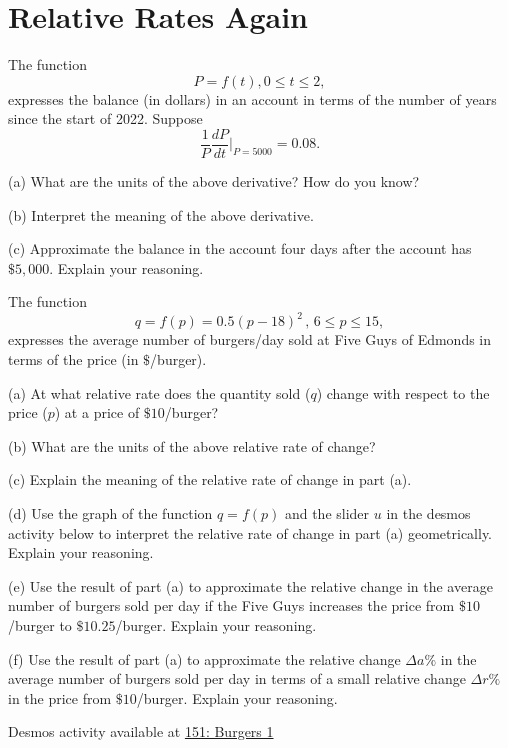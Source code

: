 \documentclass{ximera}
\begin{document}
\section*{Relative Rates Again}

\begin{question}   \label{Q45fggfbhyhy}
The function
\[
     P = f(t) , 0\leq t \leq 2,
\]
expresses the balance (in dollars) in an account in terms of the number of years since the start of 2022. Suppose 
\[
      \frac{1}{P} \frac{dP}{dt} \Big|_{P=5000} = 0.08 .
\]

(a) What are the units of the above derivative? How do you know?

(b) Interpret the meaning of the above derivative.

(c) Approximate the balance in the account four days after the account has $\$5,000$. Explain your reasoning.

\end{question}


\begin{question}  \label{Qe5r54tggrgtre}
The function 
\[
    q = f(p) = 0.5(p-18)^2 \, , \, 6\leq p \leq 15 , 
\]
expresses the average number of burgers/day sold at Five Guys of Edmonds in terms of the price (in $\$$/burger).

(a) At what relative rate does the quantity sold ($q$) change with respect to the price ($p$) at a price of $\$10$/burger?

(b) What are the units of the above relative rate of change?

(c) Explain the meaning of the relative rate of change in part (a).

(d) Use the graph of the function $q=f(p)$ and the slider $u$ in the desmos activity below to interpret the relative rate of change in part (a) geometrically. Explain your reasoning.

(e) Use the result of part (a) to approximate the relative change in the average number of burgers sold per day if the Five Guys increases the price from $\$10$/burger to $\$10.25$/burger. Explain your reasoning.

(f) Use the result of part (a) to approximate the relative change $\Delta a\%$ in the average number of burgers sold per day in terms of a small relative change $\Delta r \%$ in the price from $\$10$/burger. Explain your reasoning.

%

\begin{onlineOnly}
    \begin{center}
\end{center}
\end{onlineOnly}


Desmos activity available at \href{https://www.desmos.com/calculator/ylgk03oaza}{151: Burgers 1}

\end{question}
\end{document}
